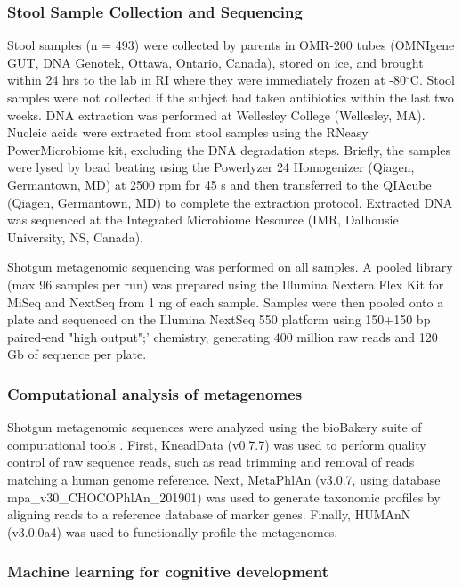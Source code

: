 \documentclass{article}
\begin{document}
\subsubsection*{Stool Sample Collection and Sequencing}

Stool samples (n = 493) were collected by parents in OMR-200 tubes
(OMNIgene GUT, DNA Genotek, Ottawa, Ontario, Canada), stored on ice, and
brought within 24 hrs to the lab in RI where they were immediately
frozen at -80$^{\circ}$C. Stool samples were not collected if the subject had
taken antibiotics within the last two weeks. DNA extraction was
performed at Wellesley College (Wellesley, MA). Nucleic acids were
extracted from stool samples using the RNeasy PowerMicrobiome kit,
excluding the DNA degradation steps. Briefly, the samples were lysed by
bead beating using the Powerlyzer 24 Homogenizer (Qiagen, Germantown,
MD) at 2500 rpm for 45 s and then transferred to the QIAcube (Qiagen,
Germantown, MD) to complete the extraction protocol. Extracted DNA was
sequenced at the Integrated Microbiome Resource (IMR, Dalhousie
University, NS, Canada).

Shotgun metagenomic sequencing was performed on all samples. A pooled
library (max 96 samples per run) was prepared using the Illumina Nextera
Flex Kit for MiSeq and NextSeq from 1 ng of each sample. Samples were
then pooled onto a plate and sequenced on the Illumina NextSeq 550
platform using 150+150 bp paired-end "high output";' chemistry,
generating 400 million raw reads and 120 Gb of sequence per plate.

\subsubsection*{Computational analysis of metagenomes}

Shotgun metagenomic sequences were analyzed using the bioBakery suite of
computational tools \cite{beghiniIntegratingTaxonomicFunctional2021}.
First, KneadData (v0.7.7) was used to perform quality
control of raw sequence reads, such as read trimming and removal of
reads matching a human genome reference. Next, MetaPhlAn (v3.0.7, using
database mpa\_v30\_CHOCOPhlAn\_201901) was used to generate taxonomic
profiles by aligning reads to a reference database of marker genes.
Finally, HUMAnN (v3.0.0a4) was used to functionally profile the
metagenomes.

\subsubsection*{Machine learning for cognitive development}
\end{document}
